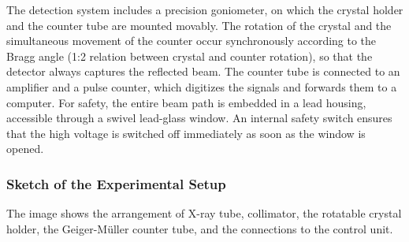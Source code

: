 The detection system includes a precision goniometer, on which the crystal holder and the counter tube are mounted movably. The rotation of the crystal and the simultaneous movement of the counter occur synchronously according to the Bragg angle (1:2 relation between crystal and counter rotation), so that the detector always captures the reflected beam. The counter tube is connected to an amplifier and a pulse counter, which digitizes the signals and forwards them to a computer. For safety, the entire beam path is embedded in a lead housing, accessible through a swivel lead-glass window. An internal safety switch ensures that the high voltage is switched off immediately as soon as the window is opened.

\subsubsection*{Sketch of the Experimental Setup}
\label{sec:Skizze}
The image shows the arrangement of X-ray tube, collimator, the rotatable crystal holder, the Geiger-Müller counter tube, and the connections to the control unit.

